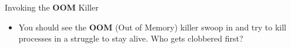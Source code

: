 \begin{Lab}
\begin{exe} {Invoking the \textbf{OOM} Killer}
\begin{itemize}
         \item

         You should see the \textbf{OOM} (Out of Memory) killer
         swoop in and try to kill processes in a struggle to stay
         alive. Who gets clobbered first?
      \end{itemize}

      \begin{sol}
         \begin{alltt}
         \end{alltt}

      \end{sol}

   \end{exe}
\end{Lab}
